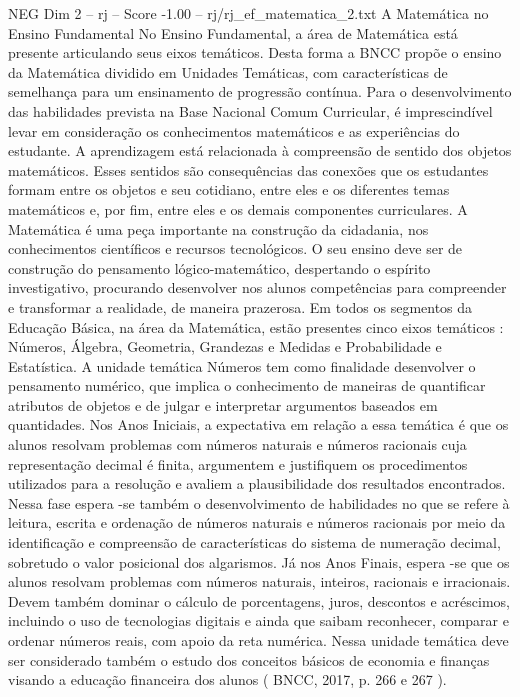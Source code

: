 \begin{textsample}{NEG Dim 2 – rj – Score -1.00 – rj/rj\_ef\_matematica\_2.txt}  \label{ex:f2_neg_052}
A Matemática no Ensino Fundamental No Ensino Fundamental, a área de Matemática está presente articulando seus eixos temáticos.
Desta forma a BNCC propõe o ensino da Matemática dividido em Unidades Temáticas, com características de semelhança para um ensinamento de progressão contínua.
Para o desenvolvimento das habilidades prevista na Base Nacional Comum Curricular, é imprescindível levar em consideração os conhecimentos matemáticos e as experiências do estudante.
A aprendizagem está relacionada à compreensão de sentido dos objetos matemáticos.
Esses sentidos são consequências das conexões que os estudantes formam entre os objetos e seu cotidiano, entre eles e os diferentes temas matemáticos e, por fim, entre eles e os demais componentes curriculares.
A Matemática é uma peça importante na construção da cidadania, nos conhecimentos científicos e recursos tecnológicos.
O seu ensino deve ser de construção do pensamento lógico-matemático, despertando o espírito investigativo, procurando desenvolver nos alunos competências para compreender e transformar a realidade, de maneira prazerosa.
Em todos os segmentos da Educação Básica, na área da Matemática, estão presentes cinco eixos temáticos : Números, Álgebra, Geometria, Grandezas e Medidas e Probabilidade e Estatística.
A unidade temática Números tem como finalidade desenvolver o pensamento numérico, que implica o conhecimento de maneiras de quantificar atributos de objetos e de julgar e interpretar argumentos baseados em quantidades.
Nos Anos Iniciais, a expectativa em relação a essa temática é que os alunos resolvam problemas com números naturais e números racionais cuja representação decimal é finita, argumentem e justifiquem os procedimentos utilizados para a resolução e avaliem a plausibilidade dos resultados encontrados.
Nessa fase espera -se também o desenvolvimento de habilidades no que se refere à leitura, escrita e ordenação de números naturais e números racionais por meio da identificação e compreensão de características do sistema de numeração decimal, sobretudo o valor posicional dos algarismos.
Já nos Anos Finais, espera -se que os alunos resolvam problemas com números naturais, inteiros, racionais e irracionais.
Devem também dominar o cálculo de porcentagens, juros, descontos e acréscimos, incluindo o uso de tecnologias digitais e ainda que saibam reconhecer, comparar e ordenar números reais, com apoio da reta numérica.
Nessa unidade temática deve ser considerado também o estudo dos conceitos básicos de economia e finanças visando a educação financeira dos alunos ( BNCC, 2017, p. 266 e 267 ).

\end{textsample}
